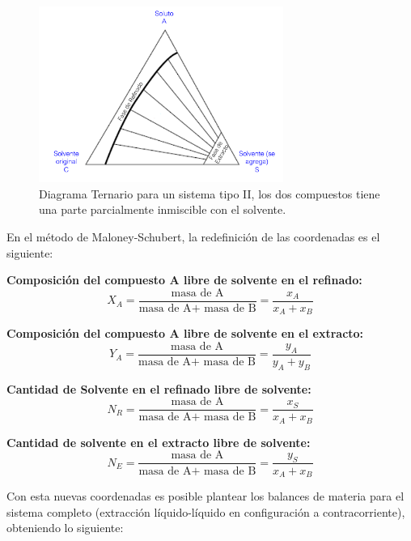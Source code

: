 \documentclass[11pt]{book}
\begin{document}
\begin{figure}[H]
    \centering
    \includegraphics[width = 8cm ]{img/LiquidoLiquido/ExtraccionLiqLiqMetodoMaloneySchubert_1.PNG}
    \caption{Diagrama Ternario para un sistema tipo II, los dos compuestos tiene una parte parcialmente inmiscible con el solvente.}
    \label{fig:ExtraccionLiqLiqMaloneySchubert_1}
\end{figure}

En el método de Maloney-Schubert, la redefinición de las coordenadas es el siguiente:

\textbf{Composición del compuesto A libre de solvente en el refinado:}
\begin{equation}
    \label{eq:ExtraccionLiqLiqMaloney_1}
    X_A = \frac{\textrm{masa de A}}{\textrm{masa de A}+ \textrm{ masa de B}} = \frac{x_A}{x_A + x_B}
\end{equation}

\textbf{Composición del compuesto A libre de solvente en el extracto:}
\begin{equation}
    \label{eq:ExtraccionLiqLiqMaloney_2}
    Y _A = \frac{\textrm{masa de A}}{\textrm{masa de A}+ \textrm{ masa de B}} = \frac{y_A}{y_A + y_B}
\end{equation}

\textbf{Cantidad de Solvente en el refinado libre de solvente:}
\begin{equation}
    \label{eq:ExtraccionLiqLiqMaloney_3}
    N_R = \frac{\textrm{masa de A}}{\textrm{masa de A}+ \textrm{ masa de B}} = \frac{x_S}{x_A + x_B}
\end{equation}

\textbf{Cantidad de solvente en el extracto libre de solvente:}
\begin{equation}
    \label{eq:ExtraccionLiqLiqMaloney_4}
    N_E = \frac{\textrm{masa de A}}{\textrm{masa de A}+ \textrm{ masa de B}} = \frac{y_S}{x_A + x_B}
\end{equation}

Con esta nuevas coordenadas es posible plantear los balances de materia para el sistema completo (extracción líquido-líquido en configuración a contracorriente), obteniendo lo siguiente:
\end{document}
